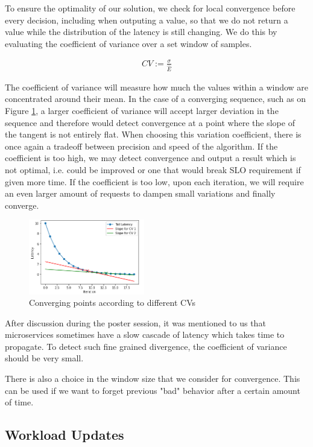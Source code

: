 \documentclass[10pt,conference,compsocconf]{IEEEtran}
\begin{document}
To ensure the optimality of our solution, we check for local convergence before every decision, including when outputing a value, so that we do not return a value while the distribution of the latency is still changing. We do this by evaluating the coefficient of variance  over a set window of samples.

\begin{align*}
	CV := \frac{\sigma}{\hat{E}}
\end{align*}

The coefficient of variance will measure how much the values within a window are concentrated around their mean. In the case of a converging sequence, such as on Figure \ref{fig:cv}, a larger coefficient of variance will accept larger deviation in the sequence and therefore would detect convergence at a point where the slope of the tangent is not entirely flat. When choosing this variation coefficient, there is once again a tradeoff between precision and speed of the algorithm. If the coefficient is too high, we may detect convergence and output a result which is not optimal, i.e. could be improved or one that would break SLO requirement if given more time. If the coefficient is too low, upon each iteration, we will require an even larger amount of requests to dampen small variations and finally converge.

\begin{figure}[H]
	\centering
	\includegraphics[width=0.45\textwidth]{CV.png}
	\caption{Converging points according to different CVs}
	\label{fig:cv}
\end{figure}

After discussion during the poster session, it was mentioned to us that microservices sometimes have a slow cascade of latency which takes time to propagate. To detect such fine grained divergence, the coefficient of variance should be very small.

There is also a choice in the window size that we consider for convergence. This can be used if we want to forget previous "bad" behavior after a certain amount of time.

\subsection{Workload Updates}
\end{document}
